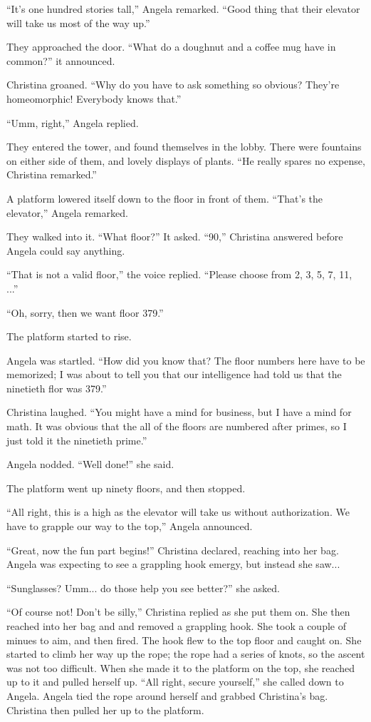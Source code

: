 \documentclass[showtrims,b6paper,draft,10pt]{memoir}
\begin{document}
``It's one hundred stories tall,''  Angela remarked.  ``Good thing that their elevator will take us most of the way up.''

They approached the door.  ``What do a doughnut and a coffee mug have in common?'' it announced.

Christina groaned.  ``Why do you have to ask something so obvious?  They're homeomorphic!  Everybody knows that.''

``Umm, right,'' Angela replied.

They entered the tower, and found themselves in the lobby.  There were fountains on either side of them, and lovely displays of plants.  ``He really spares no expense, Christina remarked.''

A platform lowered itself down to the floor in front of them.  ``That's the elevator,'' Angela remarked.

They walked into it.  ``What floor?''  It asked.  ``90,''  Christina answered before Angela could say anything. 

``That is not a valid floor,'' the voice replied.  ``Please choose from 2, 3, 5, 7, 11, ...''

``Oh, sorry, then we want floor 379.''

The platform started to rise.

Angela was startled.  ``How did you know that?  The floor numbers here have to be memorized;  I was about to tell you that our intelligence had told us that the ninetieth flor was 379.''

Christina laughed.  ``You might have a mind for business, but I have a mind for math.  It was obvious that the all of the floors are numbered after primes, so I just told it the ninetieth prime.''

Angela nodded.  ``Well done!''  she said.

The platform went up ninety floors, and then stopped.

``All right, this is a high as the elevator will take us without authorization.  We have to grapple our way to the top,'' Angela announced.

``Great, now the fun part begins!''  Christina declared, reaching into her bag.  Angela was expecting to see a grappling hook emergy, but instead she saw...

``Sunglasses?  Umm... do those help you see better?''  she asked.

``Of course not! Don't be silly,''  Christina replied as she put them on.  She then reached into her bag and and removed a grappling hook.  She took a couple of minues to aim, and then fired.  The hook flew to the top floor and caught on.  She started to climb her way up the rope;  the rope had a series of knots, so the ascent was not too difficult.  When she made it to the platform on the top, she reached up to it and pulled herself up.  ``All right, secure yourself,'' she called down to Angela.  Angela tied the rope around herself and grabbed Christina's bag.  Christina then pulled her up to the platform.
\end{document}
